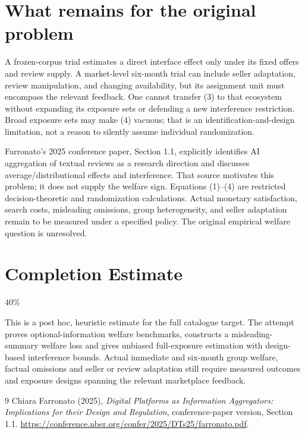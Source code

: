 \documentclass[11pt]{article}
\begin{document}
\section{What remains for the original problem}
A frozen-corpus trial estimates a direct interface effect only under its
fixed offers and review supply. A market-level six-month trial can include
seller adaptation, review manipulation, and changing availability, but its
assignment unit must encompass the relevant feedback. One cannot transfer
(3) to that ecosystem without expanding its exposure sets or defending a
new interference restriction. Broad exposure sets may make (4) vacuous;
that is an identification-and-design limitation, not a reason to silently
assume individual randomization.

Farronato's 2025 conference paper, Section 1.1, explicitly identifies
AI aggregation of textual reviews as a research direction and discusses
average/distributional effects and interference. That source motivates
this problem; it does not supply the welfare sign. Equations (1)--(4)
are restricted decision-theoretic and randomization calculations.
Actual monetary satisfaction, search costs, misleading omissions, group
heterogeneity, and seller adaptation remain to be measured under a
specified policy. The original empirical welfare question is unresolved.

\section{Completion Estimate}
40\%

This is a post hoc, heuristic estimate for the full catalogue target.
The attempt proves optional-information welfare benchmarks, constructs a misleading-summary welfare loss and gives unbiased full-exposure estimation with design-based interference bounds. Actual immediate and six-month group welfare, factual omissions and seller or review adaptation still require measured outcomes and exposure designs spanning the relevant marketplace feedback.

\begin{thebibliography}{9}
 Chiara Farronato (2025),
\emph{Digital Platforms as Information Aggregators: Implications for their
Design and Regulation}, conference-paper version, Section 1.1.
\url{https://conference.nber.org/confer/2025/DTs25/farronato.pdf}.
\end{thebibliography}
\end{document}
